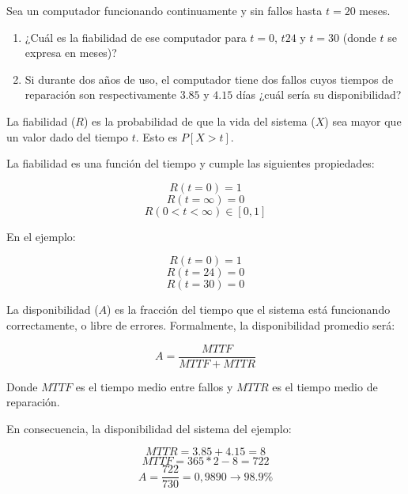 \begin{acexercise}\end{acexercise}

Sea un computador funcionando continuamente y sin fallos hasta $t=20$ meses.

\begin{enumerate}

\item ¿Cuál es la fiabilidad de ese computador para $t=0$, $t24$ y $t=30$ (donde $t$ se expresa en meses)?

\item Si durante dos años de uso, el computador tiene dos fallos cuyos tiempos de reparación son 
      respectivamente $3.85$ y $4.15$ días ¿cuál sería su disponibilidad?

\end{enumerate}

\begin{acsolution}\end{acsolution}

La fiabilidad ($R$) es la probabilidad de que la vida del sistema ($X$) 
sea mayor que un valor dado del tiempo $t$. Esto es $P[X>t]$.

La fiabilidad es una función del tiempo y cumple las siguientes propiedades:

\[ R(t=0)=1 \]
\[ R(t=\infty)=0 \]
\[ R(0<t<\infty) \in [0,1] \]

En el ejemplo:

\[R(t=0)=1\] 
\[R(t=24)=0\] 
\[R(t=30)=0\]

La disponibilidad ($A$) es la fracción del tiempo que el sistema está funcionando correctamente,
o libre de errores.
Formalmente, la disponibilidad promedio será:

\[
A=\frac{MTTF}{MTTF+MTTR}
\]

Donde $MTTF$ es el tiempo medio entre fallos y $MTTR$ es el tiempo medio de reparación.

En consecuencia, la disponibilidad del sistema del ejemplo:

\[ MTTR=3.85+4.15=8 \]
\[ MTTF=365*2-8=722 \]
\[ A=\frac{722}{730}= 0,9890 \rightarrow 98.9\% \]
